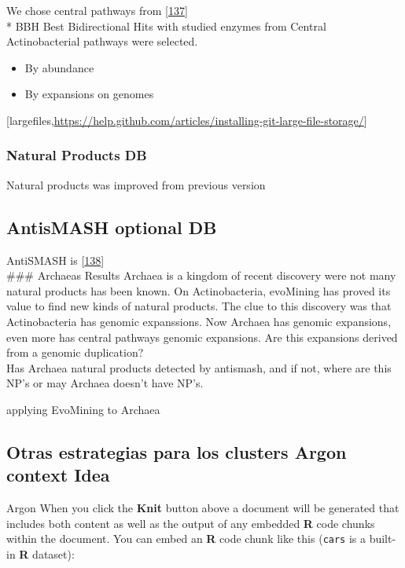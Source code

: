 \documentclass[12pt,twoside]{reedthesis}
\begin{document}
  We chose central pathways from
  {[}\protect\hyperlink{ref-barona-gomezux5fwhatux5f2012}{137}{]}\\
  * BBH Best Bidirectional Hits with studied enzymes from Central
  Actinobacterial pathways were selected.
  
  \begin{itemize}
  \item
    By abundance
  \item
    By expansions on genomes
  \end{itemize}
  
  {[}largefiles,\url{https://help.github.com/articles/installing-git-large-file-storage/}{]}
  
  \subsubsection{Natural Products DB}\label{natural-products-db}
  
  Natural products was improved from previous version
  
  \subsection{AntisMASH optional DB}\label{antismash-optional-db}
  
  AntiSMASH is
  {[}\protect\hyperlink{ref-weberux5fantismashux5f2015}{138}{]}\\
  \#\#\# Archaeas Results Archaea is a kingdom of recent discovery were
  not many natural products has been known. On Actinobacteria, evoMining
  has proved its value to find new kinds of natural products. The clue to
  this discovery was that Actinobacteria has genomic expanssions. Now
  Archaea has genomic expansions, even more has central pathways genomic
  expansions. Are this expansions derived from a genomic duplication?\\
  Has Archaea natural products detected by antismash, and if not, where
  are this NP's or may Archaea doesn't have NP's.
  
  applying EvoMining to Archaea
  
  \subsection{Otras estrategias para los clusters Argon context
  Idea}\label{otras-estrategias-para-los-clusters-argon-context-idea}
  
  Argon When you click the \textbf{Knit} button above a document will be
  generated that includes both content as well as the output of any
  embedded \textbf{R} code chunks within the document. You can embed an
  \textbf{R} code chunk like this (\texttt{cars} is a built-in \textbf{R}
  dataset):
  
\end{document}
